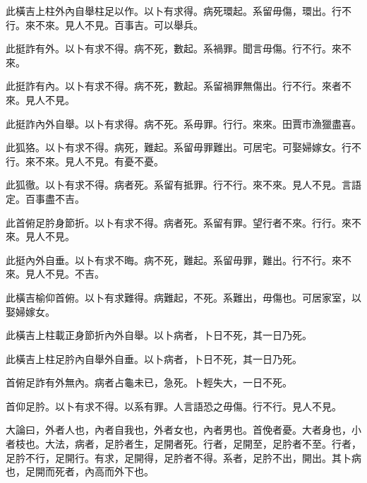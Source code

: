 此橫吉上柱外內自舉柱足以作。以卜有求得。病死環起。系留毋傷，環出。行不行。來不來。見人不見。百事吉。可以舉兵。

此挺詐有外。以卜有求不得。病不死，數起。系禍罪。聞言毋傷。行不行。來不來。

此挺詐有內。以卜有求不得。病不死，數起。系留禍罪無傷出。行不行。來者不來。見人不見。

此挺詐內外自舉。以卜有求得。病不死。系毋罪。行行。來來。田賈市漁獵盡喜。

此狐狢。以卜有求不得。病死，難起。系留毋罪難出。可居宅。可娶婦嫁女。行不行。來不來。見人不見。有憂不憂。

此狐徹。以卜有求不得。病者死。系留有抵罪。行不行。來不來。見人不見。言語定。百事盡不吉。

此首俯足肣身節折。以卜有求不得。病者死。系留有罪。望行者不來。行行。來不來。見人不見。

此挺內外自垂。以卜有求不晦。病不死，難起。系留毋罪，難出。行不行。來不來。見人不見。不吉。

此橫吉榆仰首俯。以卜有求難得。病難起，不死。系難出，毋傷也。可居家室，以娶婦嫁女。

此橫吉上柱載正身節折內外自舉。以卜病者，卜日不死，其一日乃死。

此橫吉上柱足肣內自舉外自垂。以卜病者，卜日不死，其一日乃死。

首俯足詐有外無內。病者占龜未已，急死。卜輕失大，一日不死。

首仰足肣。以卜有求不得。以系有罪。人言語恐之毋傷。行不行。見人不見。

大論曰，外者人也，內者自我也，外者女也，內者男也。首俛者憂。大者身也，小者枝也。大法，病者，足肣者生，足開者死。行者，足開至，足肣者不至。行者，足肣不行，足開行。有求，足開得，足肣者不得。系者，足肣不出，開出。其卜病也，足開而死者，內高而外下也。